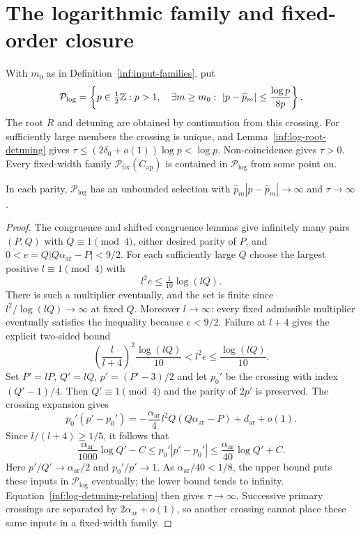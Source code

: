 \section{The logarithmic family and fixed-order closure}
\label{inf:sec-logarithmic}

\begin{definition}\label{inf:log-family}
With $m_0$ as in Definition~\ref{inf:input-families}, put
\[
 \mathcal P_{\log}=\left\{p\in\tfrac12\mathbb{Z}:p>1,\quad
 \exists m\ge m_0:\ |p-\widehat p_m|\le\frac{\log p}{8p}\right\}.
\]
The root $R$ and detuning are obtained by continuation from this
crossing. For sufficiently large members the crossing is unique,
and Lemma~\ref{inf:log-root-detuning} gives
$\tau\le(2\delta_0+o(1))\log p<\log p$.
Non-coincidence gives $\tau>0$.
Every fixed-width family $\mathcal P_{\mathrm{fix}}(C_{\mathrm{ap}})$ is contained
in $\mathcal P_{\log}$ from some point on.
\end{definition}

\begin{lemma}\label{inf:log-multiplier}
In each parity, $\mathcal P_{\log}$ has an unbounded selection with
$\widehat p_m|p-\widehat p_m|\to\infty$ and $\tau\to\infty$.
\end{lemma}
\begin{proof}
The congruence and shifted congruence lemmas give infinitely many
pairs $(P,Q)$ with $Q\equiv1\pmod4$, either desired parity of $P$,
and $0<e=Q|Q\alpha_{\mathrm{ar}}-P|<9/2$.
For each sufficiently large $Q$ choose the largest positive
$l\equiv1\pmod4$ with
\[
 l^2e\le\tfrac1{10}\log(lQ).
\]
There is such a multiplier eventually, and the set is finite since
$l^2/\log(lQ)\to\infty$ at fixed $Q$. Moreover $l\to\infty$:
every fixed admissible multiplier eventually satisfies the inequality
because $e<9/2$. Failure at $l+4$ gives the explicit two-sided bound
\begin{equation}\label{inf:multiplier-two-sided}
 \left(\frac l{l+4}\right)^2\frac{\log(lQ)}{10}
 <l^2e\le\frac{\log(lQ)}{10}.
\end{equation}
Set $P'=lP$, $Q'=lQ$, $p'=(P'-3)/2$ and let $p_0'$ be the
crossing with index $(Q'-1)/4$. Then $Q'\equiv1\pmod4$ and the
parity of $2p'$ is preserved. The crossing expansion gives
\[
 p_0'(p'-p_0')
 =-\frac{\alpha_{\mathrm{ar}}}{4}l^2Q(Q\alpha_{\mathrm{ar}}-P)
          +d_{\mathrm{ar}}+o(1).
\]
Since $l/(l+4)\ge1/5$, it follows that
\[
 \frac{\alpha_{\mathrm{ar}}}{1000}\log Q'-C
 \le p_0'|p'-p_0'|
 \le\frac{\alpha_{\mathrm{ar}}}{40}\log Q'+C.
\]
Here $p'/Q'\to\alpha_{\mathrm{ar}}/2$ and
$p_0'/p'\to1$. As $\alpha_{\mathrm{ar}}/40<1/8$, the upper bound
puts these inputs in $\mathcal P_{\log}$ eventually; the lower
bound tends to infinity. Equation~\eqref{inf:log-detuning-relation}
then gives $\tau\to\infty$. Successive primary crossings are
separated by $2\alpha_{\mathrm{ar}}+o(1)$, so another crossing
cannot place these same inputs in a fixed-width family.
\end{proof}

